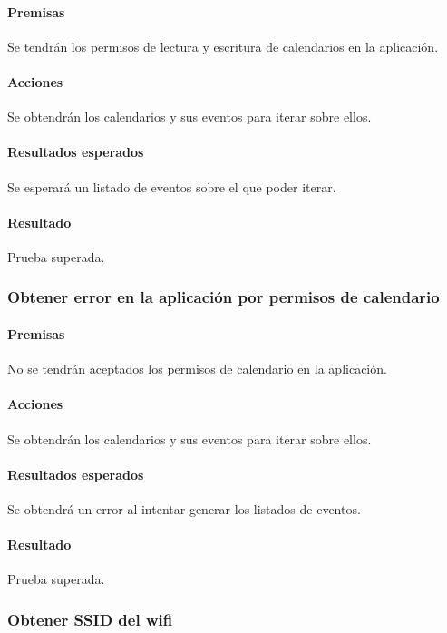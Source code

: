 \paragraph{Premisas}
Se tendrán los permisos de lectura y escritura de calendarios en la aplicación.


\paragraph{Acciones}
Se obtendrán los calendarios y sus eventos para iterar sobre ellos.

\paragraph{Resultados esperados}
Se esperará un listado de eventos sobre el que poder iterar.

\paragraph{Resultado}
Prueba superada.

\subsubsection{Obtener error en la aplicación por permisos de calendario}

\paragraph{Premisas}
No se tendrán aceptados los permisos de calendario en la aplicación.


\paragraph{Acciones}
Se obtendrán los calendarios y sus eventos para iterar sobre ellos.

\paragraph{Resultados esperados}
Se obtendrá un error al intentar generar los listados de eventos.

\paragraph{Resultado}
Prueba superada.

\subsubsection{Obtener SSID del wifi}

